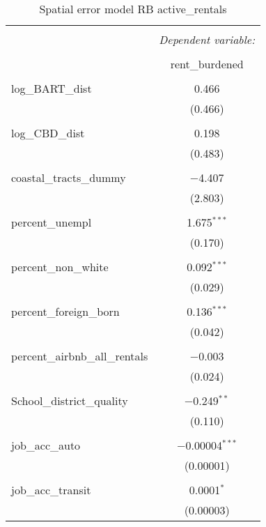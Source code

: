 \documentclass[10pt, letterpaper]{amsart}
\begin{document}
\begin{table}[H] \centering 
  \caption{Spatial error model RB active\_rentals} 
  \label{}
  \begin{tabular}{@{\extracolsep{5pt}}lc} 
    \\[-1.8ex]\hline 
    \hline \\[-1.8ex] 
    & \multicolumn{1}{c}{\textit{Dependent variable:}} \\ 
    \cline{2-2} 
    \\[-1.8ex] & rent\_burdened \\ 
    \hline \\[-1.8ex] 
    log\_BART\_dist & 0.466 \\ 
    & (0.466) \\ 
    & \\ 
    log\_CBD\_dist & 0.198 \\ 
    & (0.483) \\ 
    & \\ 
    coastal\_tracts\_dummy & $-$4.407 \\ 
    & (2.803) \\ 
    & \\ 
    percent\_unempl & 1.675$^{***}$ \\ 
    & (0.170) \\ 
    & \\ 
    percent\_non\_white & 0.092$^{***}$ \\ 
    & (0.029) \\ 
    & \\ 
    percent\_foreign\_born & 0.136$^{***}$ \\ 
    & (0.042) \\ 
    & \\ 
    percent\_airbnb\_all\_rentals & $-$0.003 \\ 
    & (0.024) \\ 
    & \\ 
    School\_district\_quality & $-$0.249$^{**}$ \\ 
    & (0.110) \\ 
    & \\ 
    job\_acc\_auto & $-$0.00004$^{***}$ \\ 
    & (0.00001) \\ 
    & \\ 
    job\_acc\_transit & 0.0001$^{*}$ \\ 
    & (0.00003) \\ 

\end{tabular}
\end{table}
\end{document}
